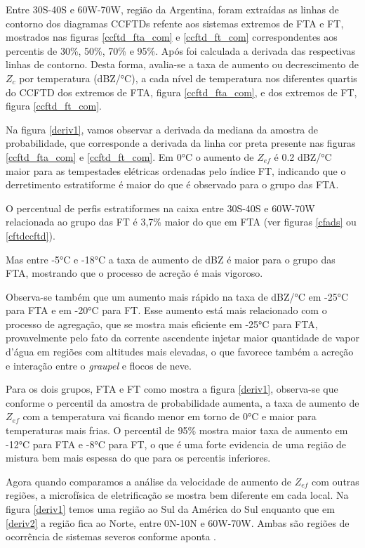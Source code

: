Entre 30S-40S e 60W-70W, região da Argentina, foram extraídas as linhas de contorno dos diagramas CCFTDs refente aos sistemas extremos de FTA e FT, mostrados nas figuras \ref{ccftd_fta_com} e \ref{ccftd_ft_com} correspondentes aos percentis de 30\%, 50\%, 70\% e 95\%. Após foi calculada a derivada das respectivas linhas de contorno. Desta forma, avalia-se a taxa de aumento ou decrescimento de $Z_c$ por temperatura (dBZ/°C), a cada nível de temperatura nos diferentes quartis do CCFTD dos extremos de FTA,  figura \ref{ccftd_fta_com},  e dos extremos de FT, figura \ref{ccftd_ft_com}.

Na figura \ref{deriv1}, vamos observar a derivada da mediana da amostra de probabilidade, que corresponde a derivada da linha cor preta presente nas figuras \ref{ccftd_fta_com} e \ref{ccftd_ft_com}. Em 0°C o aumento de $Z_{ef}$ é 0.2 dBZ/°C maior para as tempestades elétricas ordenadas pelo índice FT, indicando que o derretimento estratiforme é maior do que é observado para o grupo das FTA.

O percentual de perfis estratiformes na caixa entre  30S-40S e 60W-70W relacionada ao grupo das FT é 3,7\% maior do que em FTA (ver figuras \ref{cfads} ou \ref{cftdccftd}).  

Mas entre -5°C e -18°C a taxa de aumento de dBZ é maior para o grupo das FTA, mostrando que o processo de acreção é mais vigoroso. 

Observa-se também que um aumento mais rápido na taxa de dBZ/°C em -25°C para FTA e em -20°C para FT. Esse aumento está mais relacionado com o processo de agregação, que se mostra mais eficiente em -25°C para FTA, provavelmente pelo fato da corrente ascendente injetar maior quantidade de vapor d'água em regiões com altitudes mais elevadas, o que favorece também a acreção e interação entre o \textit{graupel} e flocos de neve. 

Para os dois grupos, FTA e FT como mostra a figura \ref{deriv1}, observa-se que conforme o percentil da amostra de probabilidade aumenta, a taxa de aumento de $Z_{ef}$ com a temperatura vai ficando menor em torno de 0°C e maior para temperaturas mais frias. O percentil de 95\% mostra maior taxa de aumento em -12°C para FTA e -8°C para FT, o que é uma forte evidencia de uma região de mistura bem mais espessa do que para os percentis inferiores. 

Agora quando comparamos a análise da velocidade de aumento de $Z_{ef}$ com outras regiões, a microfísica de eletrificação se mostra bem diferente em cada local. Na figura \ref{deriv1} temos uma região ao Sul da América do Sul enquanto que em \ref{deriv2} a região fica ao Norte, entre 0N-10N e 60W-70W. Ambas são regiões de ocorrência de sistemas severos conforme aponta \cite{cecil2005}.	 

